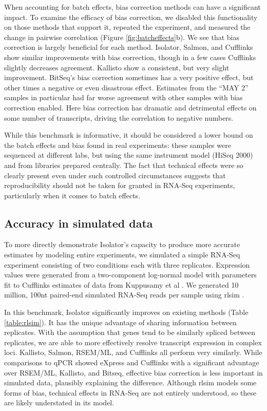 \documentclass[twocolumn]{article}
\begin{document}
When accounting for batch effects, bias correction methods can have a
significant impact. To examine the efficacy of bias correction, we disabled this
functionality on those methods that support it, repeated the experiment, and
measured the change in pairwise correlation (Figure \ref{fig:batcheffects}b). We
see that bias correction is largely beneficial for each method. Isolator,
Salmon, and Cufflinks show similar improvements with bias correction, though in
a few cases Cufflinks slightly decreases agreement. Kallisto show a consistent,
but very slight improvement. BitSeq's bias correction sometimes has a very
positive effect, but other times a negative or even disastrous effect. Estimates
from the ``MAY 2'' samples in particular had far worse agreement with other
samples with bias correction enabled. Here bias correction has dramatic and
detrimental effects on some number of transcripts, driving the correlation to
negative numbers.

While this benchmark is informative, it should be considered a lower bound on
the batch effects and bias found in real experiments: these samples were
sequenced at different labs, but using the same instrument model (HiSeq 2000)
and from libraries prepared centrally. The fact that technical effects were so
clearly present even under such controlled circumstances suggests that
reproducibility should not be taken for granted in RNA-Seq experiments,
particularly when it comes to batch effects.

\subsection{Accuracy in simulated data}\label{accuracy-in-simulated-data}

To more directly demonstrate Isolator's capacity to produce more accurate
estimates by modeling entire experiments, we simulated a simple RNA-Seq
experiment consisting of two conditions each with three replicates. Expression
values were generated from a two-component log-normal model with parameters fit
to Cufflinks estimates of data from Kuppusamy et al \cite{Kuppusamy:2015ey}. We
generated 10 million, 100nt paired-end simulated RNA-Seq reads per sample using
rlsim \cite{Sipos:2013tz}.

In this benchmark, Isolator significantly improves on existing methods (Table
\ref{table:rlsim}). It has the unique advantage of sharing information between
replicates. With the assumption that genes tend to be similarly spliced between
replicates, we are able to more effectively resolve transcript expression in
complex loci. Kallisto, Salmon, RSEM/ML, and Cufflinks all perform very
similarly. While comparisons to qPCR showed eXpress and Cufflinks with a
significant advantage over RSEM/ML, Kallisto, and Bitseq, effective bias
correction is less important in simulated data, plausibly explaining the
difference. Although rlsim models some forms of bias, technical effects in
RNA-Seq are not entirely understood, so these are likely understated in its
model.
\end{document}
